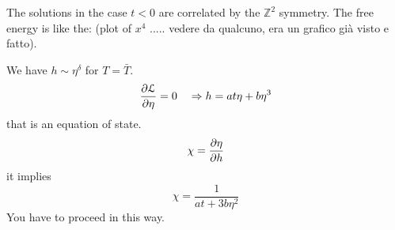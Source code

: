 \documentclass[../main/main.tex]{subfiles}
\begin{document}
The solutions in the case \( t<0 \) are correlated by the \( \mathbb{Z}^2 \) symmetry.
The free energy is like the: (plot of \( x^4 \) ..... vedere da qualcuno, era un grafico già visto e fatto).

We have \( h \sim \eta ^\delta  \) for \( T = \bar{T}  \).
\begin{equation}
  \pdv{\mathcal{L}}{\eta } = 0 \quad \Rightarrow  h=a t \eta + b \eta ^3
\end{equation}
that is an equation of state.
\begin{equation}
  \chi = \pdv{\eta }{h}
\end{equation}
it implies
\begin{equation}
  \chi = \frac{1}{at+3 b \eta ^2}
\end{equation}
You have to proceed in this way.
\end{document}
